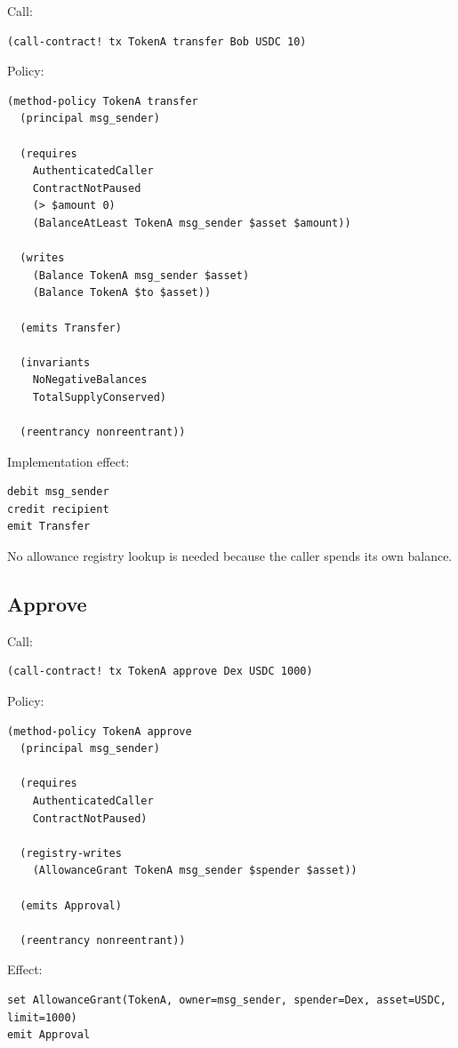 \documentclass[11pt]{article}
\begin{document}
Call:

\begin{lstlisting}
(call-contract! tx TokenA transfer Bob USDC 10)
\end{lstlisting}

Policy:

\begin{lstlisting}
(method-policy TokenA transfer
  (principal msg_sender)

  (requires
    AuthenticatedCaller
    ContractNotPaused
    (> $amount 0)
    (BalanceAtLeast TokenA msg_sender $asset $amount))

  (writes
    (Balance TokenA msg_sender $asset)
    (Balance TokenA $to $asset))

  (emits Transfer)

  (invariants
    NoNegativeBalances
    TotalSupplyConserved)

  (reentrancy nonreentrant))
\end{lstlisting}

Implementation effect:

\begin{lstlisting}
debit msg_sender
credit recipient
emit Transfer
\end{lstlisting}

No allowance registry lookup is needed because the caller spends its own balance.

\subsection{Approve}

Call:

\begin{lstlisting}
(call-contract! tx TokenA approve Dex USDC 1000)
\end{lstlisting}

Policy:

\begin{lstlisting}
(method-policy TokenA approve
  (principal msg_sender)

  (requires
    AuthenticatedCaller
    ContractNotPaused)

  (registry-writes
    (AllowanceGrant TokenA msg_sender $spender $asset))

  (emits Approval)

  (reentrancy nonreentrant))
\end{lstlisting}

Effect:

\begin{lstlisting}
set AllowanceGrant(TokenA, owner=msg_sender, spender=Dex, asset=USDC, limit=1000)
emit Approval
\end{lstlisting}
\end{document}
